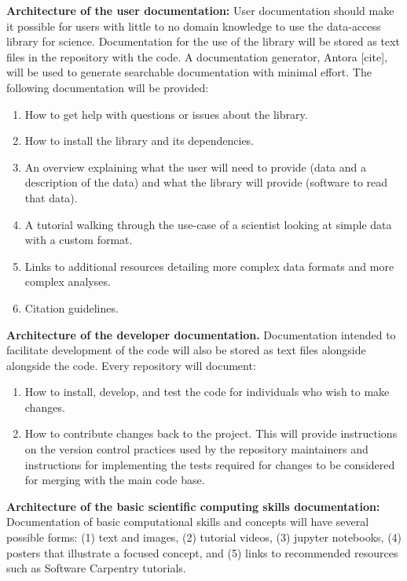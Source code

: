 \textbf{Architecture of the user documentation:} User documentation should make it possible for users with little to no domain knowledge to use the data-access library for science.  Documentation for the use of the library will be stored as text files in the repository with the code.  A documentation generator, Antora [cite], will be used to generate searchable documentation with minimal effort.  The following documentation will be provided:

\begin{enumerate}
    \item How to get help with questions or issues about the library.
    \item How to install the library and its dependencies.
    \item An overview explaining what the user will need to provide (data and a description of the data) and what the library will provide (software to read that data).
    \item A tutorial walking through the use-case of a scientist looking at simple data with a custom format.
    \item Links to additional resources detailing more complex data formats and more complex analyses.
    \item Citation guidelines.  
\end{enumerate}


\textbf{Architecture of the developer documentation.}  Documentation intended to facilitate development of the code will also be stored as text files alongside alongside the code.  Every repository will document:

\begin{enumerate}
    \item How to install, develop, and test the code for individuals who wish to make changes.  
    \item How to contribute changes back to the project.  This will provide instructions on the version control practices used by the repository maintainers and instructions for implementing the tests required for changes to be considered for merging with the main code base.
\end{enumerate}

\textbf{Architecture of the basic scientific computing skills documentation:}  Documentation of basic computational skills and concepts will have several possible forms: (1) text and images, (2) tutorial videos, (3) jupyter notebooks, (4) posters that illustrate a focused concept, and (5) links to recommended resources such as Software Carpentry \cite{software-carpentry} tutorials.

